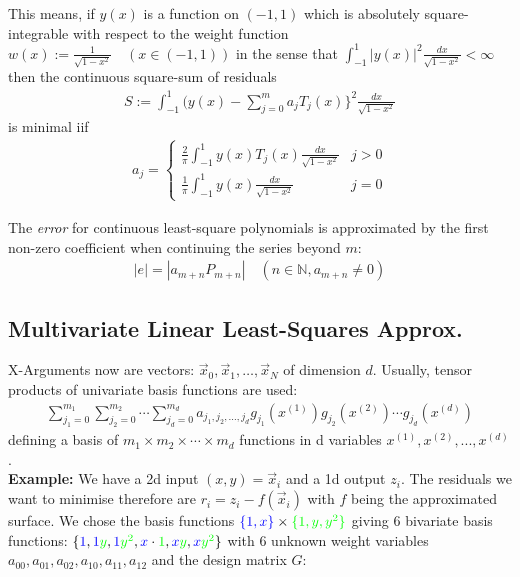 This means, if $y(x)$ is a function on $(-1,1)$ which is absolutely square-integrable with respect to the
weight function $w(x):={\frac{1}{\sqrt{1-x^{2}}}}\quad(x\in(-1,1))$ in the sense that
$\int_{-1}^1|y(x)|^{2}{\frac{d x}{{\sqrt{1-x^{2}}}}<\infty}$
then the continuous square-sum of residuals
\begin{align*}
    S := \int_{-1}^1\biggl(y(x)-\sum_{j=0}^{m}a_{j}T_{j}(x)\biggr\}^{2}\frac{d x}{\sqrt{1-x^{2}}}
\end{align*}
is minimal iif
\begin{align*}
    a_{j} =
    \left\{
    \begin{matrix}
        \frac{2}{\pi}\int_{-1}^{1}y(x)T_{j}(x)\frac{d x}{\sqrt{1-x^{2}}} & j > 0 \\
        \frac{1}{\pi}\int_{-1}^{1}y(x)\frac{d x}{\sqrt{1-x^{2}}}         & j = 0
    \end{matrix}
    \right.
\end{align*}

The \emph{error} for continuous least-square polynomials is approximated by the \colorbox{shadecolor}{first non-zero coefficient}
when continuing the series beyond $m$:
\begin{align*}
    |e| = |a_{m+n}P_{m+n}|\quad (n\in\mathbb{N}, a_{m+n}\neq 0)
\end{align*}

\subsection{Multivariate Linear Least-Squares Approx.}

X-Arguments now are vectors:
$\vec{x}_0, \vec{x}_1, \ldots, \vec{x}_N$ of dimension $d$.
Usually, tensor products of univariate basis functions are used:
\begin{align*}
    \sum_{j_1=0}^{m_1} \sum_{j_2=0}^{m_2}\cdots \sum_{j_d=0}^{m_d}
    a_{j_1, j_2, \ldots, j_d}g_{j_1}(x^{(1)})g_{j_2}(x^{(2)})\cdots g_{j_d}(x^{(d)})
\end{align*}
defining a basis of $m_1\times m_2\times \cdots \times m_d$ functions in d variables $x^{(1)}, x^{(2)},...,x^{(d)}$.
\\[1em]
\textbf{Example:}
We have a 2d input $(x,y)=\vec{x}_i$ and a 1d output $z_i$.
The residuals we want to minimise therefore are $r_i=z_i-f(\vec{x}_i)$ with $f$ being the approximated surface.
We chose the basis functions ${\color{blue}\{1, x\}}\times{\color{green}\{1, y, y^2\}}$ giving 6 bivariate basis functions:
$\{{\color{blue}1}, {\color{blue}1}{\color{green}y}, {\color{blue}1}{\color{green}y^2},
    {\color{blue}x}\cdot{\color{green}1}, {\color{blue}x}{\color{green}y}, {\color{blue}x}{\color{green}y^2}
\}$ with 6 unknown weight variables $a_{00}, a_{01}, a_{02}, a_{10}, a_{11}, a_{12}$ and the design matrix $G$:

